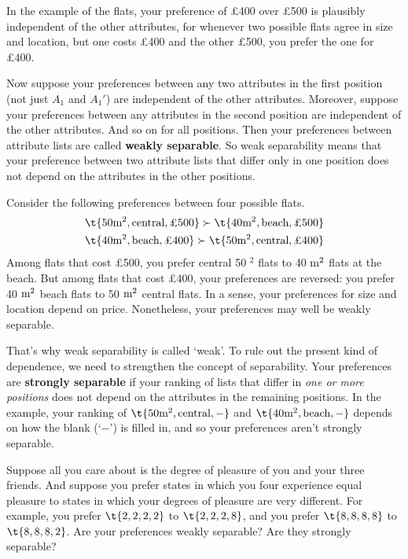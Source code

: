 In the example of the flats, your preference of £400 over £500 is plausibly
independent of the other attributes, for whenever two possible flats
agree in size and location, but one costs £400 and the other £500, you
prefer the one for £400.

Now suppose your preferences between any two attributes in the first
position (not just $A_1$ and $A_1'$) are independent of the other
attributes. Moreover, suppose your preferences between any attributes
in the second position are independent of the other attributes. And so
on for all positions. Then your preferences between attribute lists
are called \textbf{weakly separable}. So weak separability means that
your preference between two attribute lists that differ only in one
position does not depend on the attributes in the other positions.

Consider the following preferences between four possible flats.
\begin{gather*}
\t{50 \m^2, \text{central}, \text{£500}} \succ \t{40 \m^2, \text{beach}, \text{£500}}\\
\t{40 \m^2, \text{beach}, \text{£400}} \succ \t{50 \m^2, \text{central}, \text{£400}}
\end{gather*}
Among flats that cost £500, you prefer central 50 \m$^2$ flats to 40
$\text{m}^2$ flats at the beach. But among flats that cost £400, your
preferences are reversed: you prefer 40 $\text{m}^2$ beach flats to 50
$\text{m}^2$ central flats. In a sense, your preferences for size and
location depend on price. Nonetheless, your preferences may well be
weakly separable.

That's why weak separability is called `weak'. To rule out the present
kind of dependence, we need to strengthen the concept of
separability. Your preferences are \textbf{strongly separable} if your
ranking of lists that differ in \emph{one or more positions} does not
depend on the attributes in the remaining positions. In the example,
your ranking of $\t{50 \m^2, \text{central}, -}$ and $\t{40 \m^2,
  \text{beach}, -}$ depends on how the blank (`$-$') is filled in, and
so your preferences aren't strongly separable.

\begin{exercise2}
  Suppose all you care about is the degree of pleasure of you and your
  three friends. And suppose you prefer states in which you four
  experience equal pleasure to states in which your degrees of
  pleasure are very different. For example, you prefer $\t{2,2,2,2}$
  to $\t{2,2,2,8}$, and you prefer $\t{8,8,8,8}$ to $\t{8,8,8,2}$.
  Are your preferences weakly separable? Are they strongly separable?
\end{exercise2}

